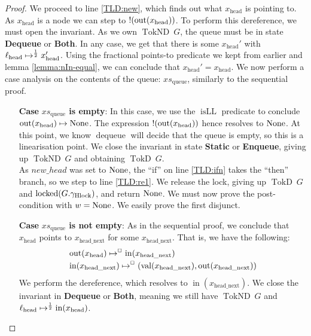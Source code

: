 \documentclass[a4paper, 10pt]{report}
\theoremstyle{definition}
\newcommand{\locked}{\operatorname{locked}}
\newcommand{\dequeue}{\operatorname{dequeue}}
\newcommand{\xsqueue}{xs_{\mathrm{queue}}}
\newcommand{\isLL}{\operatorname{isLL}}
\newcommand{\locN}[1]{\loc_{\mathrm{#1}}}
\newcommand{\lochead}{\locN{head}}
\newcommand{\nodeval}{\valB}
\newcommand{\nIn}[1]{\operatorname{in}(#1)}
\newcommand{\nVal}[1]{\operatorname{val}(#1)}
\newcommand{\nOut}[1]{\operatorname{out}(#1)}
\newcommand{\node}{x}
\newcommand{\nodeN}[1]{\node_{\mathrm{#1}}}
\newcommand{\nodehead}{\nodeN{head}}
\newcommand{\nodeheadnext}{\nodeN{head\_next}}
\newcommand{\StaticState}{\textbf{Static}\xspace}
\newcommand{\EnqueueState}{\textbf{Enqueue}\xspace}
\newcommand{\DequeueState}{\textbf{Dequeue}\xspace}
\newcommand{\BothState}{\textbf{Both}\xspace}
\newcommand{\Qg}{G}
\newcommand{\ghlock}{\gname_{\mathrm{Hlock}}}
\newcommand{\TokD}[1]{\operatorname{TokD} ~ #1}
\newcommand{\TokDQg}{\TokD{\Qg}}
\newcommand{\TokND}[1]{\operatorname{TokND} ~ #1}
\newcommand{\TokNDQg}{\TokND{\Qg}}
\newcommand{\isNode}[1]{\nIn{#1} \mapsto^{\persistently} (\nVal{#1}, \nOut{#1})}
\begin{document}
\begin{proof}
We proceed to line \ref{TLD:new}, which finds out what $\nodehead$ is pointing to. As $\nodehead$ is a node we can step to $\deref (\nOut{\nodehead})$. To perform this dereference, we must open the invariant. As we own $\TokNDQg$, the queue must be in state \DequeueState or \BothState. In any case, we get that there is some $\nodehead'$ with $\lochead \mapsto^{\frac{1}{2}} \nodehead'$. Using the fractional points-to predicate we kept from earlier and lemma \ref{lemma:nIn-equal}, we can conclude that $\nodehead' = \nodehead$. We now perform a case analysis on the contents of the queue: $\xsqueue$, similarly to the sequential proof.
\begin{itemize}
  \item[\textbf{Case}] \textbf{$\xsqueue$ is empty}:
  In this case, we use the $\isLL$ predicate to conclude $\nOut{\nodehead} \mapsto \None$. The expression $\deref (\nOut{\nodehead})$ hence resolves to $\operatorname{None}$. At this point, we know $\dequeue$ will decide that the queue is empty, so this is a linearisation point. We close the invariant in state \StaticState or \EnqueueState, giving up $\TokNDQg$ and obtaining $\TokDQg$.\\
  As $new\_head$ was set to $\operatorname{None}$, the ``if'' on line \ref{TLD:ifn} takes the ``then'' branch, so we step to line \ref{TLD:re1}. We release the lock, giving up $\TokDQg$ and $\locked(\Qg.\ghlock)$, and return $\operatorname{None}$. We must now prove the post-condition with $\nodeval = \None$. We easily prove the first disjunct.

  \item[\textbf{Case}] \textbf{$\xsqueue$ is not empty}:
  As in the sequential proof, we conclude that $\nodehead$ points to $\nodeheadnext$ for some $\nodeheadnext$. That is, we have the following:
  \begin{align}
    &\nOut{\nodehead} \mapsto^{\persistently} \nIn{\nodeheadnext}\label{TLMSQ:spec:conc:proof:deq:headtonext}\\
    &\isNode{\nodeheadnext}\label{TLMSQ:spec:conc:proof:deq:headnextnode}
  \end{align}
  We perform the dereference, which resolves to $\nIn{\nodeheadnext}$. We close the invariant in \DequeueState or \BothState, meaning we still have $\TokNDQg$ and $\lochead \mapsto^{\frac{1}{2}} \nIn{\nodehead}$.


\end{itemize}
\end{proof}
\end{document}
